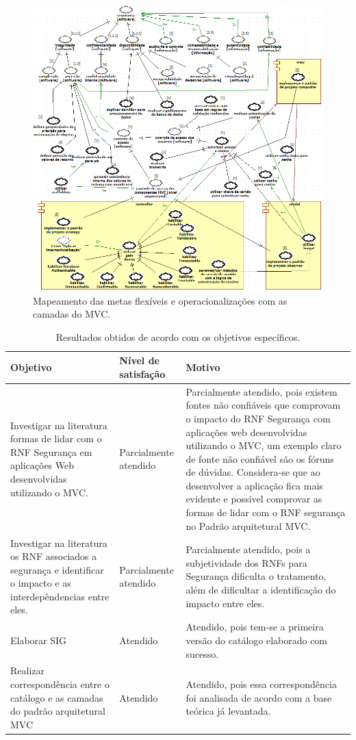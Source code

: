 \begin{figure}[h!]
	\centering
	\includegraphics[keepaspectratio=true,scale=0.7]{figuras/catalogoMapeado.PNG}
	\caption{Mapeamento das metas flexíveis e operacionalizações com as camadas do MVC.}
	\label{catalogoMapeado}
\end{figure}


\begin{table}[h!]
	\centering
	\caption{Resultados obtidos de acordo com os objetivos específicos.}
	\label{resultadosObtidos}
	\tiny
	\begin{tabular}{@{}p{6cm}p{3cm}p{6cm}@{}}
		\toprule
		\textbf{Objetivo} & \textbf{Nível de satisfação} & \textbf{Motivo} \\ \midrule
		Investigar na literatura formas de lidar com o RNF Segurança  em aplicações Web desenvolvidas utilizando o MVC. & Parcialmente atendido & Parcialmente atendido, pois existem fontes não confiáveis que comprovam o impacto do RNF Segurança com aplicações web desenvolvidas utilizando o MVC, um exemplo claro de fonte não confiável são os fóruns de dúvidas. Considera-se que ao desenvolver a aplicação fica mais evidente e possível comprovar as formas de lidar com o RNF segurança no Padrão arquitetural MVC. \\
		\rowcolor[HTML]{C0C0C0} 
		Investigar na literatura os RNF associados a segurança e identificar o impacto e as interdepêndencias entre eles. & Parcialmente atendido & Parcialmente atendido, pois a subjetividade dos RNFs para Segurança dificulta o tratamento, além de dificultar a identificação do impacto entre eles. \\
		Elaborar SIG & Atendido & Atendido, pois tem-se a primeira versão do catálogo elaborado com sucesso. \\
		\rowcolor[HTML]{C0C0C0} 
		Realizar correspondência entre o catálogo e as camadas do padrão arquitetural MVC & Atendido & Atendido, pois essa correspondência foi analisada de acordo com a base teórica já levantada. \\ \bottomrule
	\end{tabular}
\end{table}